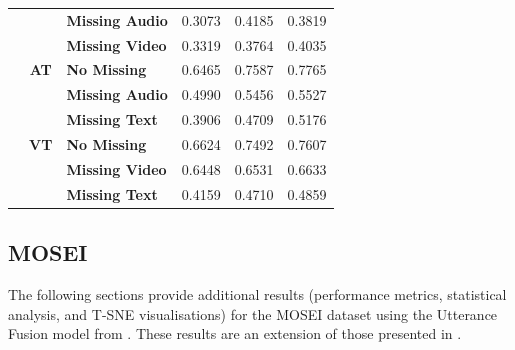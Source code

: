 \begin{table}[!phtb]
\begin{tabular}{l|c|l|cc|cc}
    \textbf{}                & \textbf{}         & \textbf{Missing Audio} & \multicolumn{2}{c|}{0.3073}              & 0.4185            & 0.3819           \\
                             & \textbf{}         & \textbf{Missing Video} & \multicolumn{2}{c|}{0.3319}              & 0.3764            & 0.4035           \\ \cline{2-7} 
                             & \textbf{AT} & \textbf{No Missing}    & \multicolumn{2}{c|}{0.6465}              & 0.7587            & 0.7765           \\
                             & \textbf{}         & \textbf{Missing Audio} & \multicolumn{2}{c|}{0.4990}              & 0.5456            & 0.5527           \\
                             & \textbf{}         & \textbf{Missing Text}  & \multicolumn{2}{c|}{0.3906}              & 0.4709            & 0.5176           \\ \cline{2-7} 
                             & \textbf{VT} & \textbf{No Missing}    & \multicolumn{2}{c|}{0.6624}              & 0.7492            & 0.7607           \\
                             & \textbf{}         & \textbf{Missing Video} & \multicolumn{2}{c|}{0.6448}              & 0.6531            & 0.6633           \\
                             &                   & \textbf{Missing Text}  & \multicolumn{2}{c|}{0.4159}              & 0.4710            & 0.4859           \\ \hline
    \end{tabular}%
\end{table}

\subsection{MOSEI}\label{sec:mosei}
\label{sec:MOSEI}
The following sections provide additional results (performance metrics, statistical analysis, and T-SNE visualisations) for the MOSEI dataset using the Utterance Fusion model from \cite{zhao-etal-2021-missing}. These results are an extension of those presented in .

